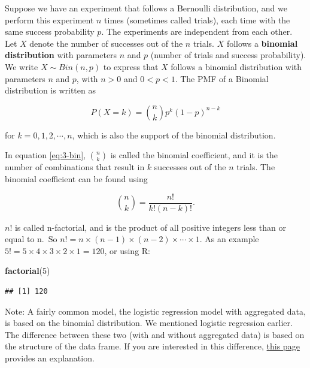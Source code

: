 \documentclass[
]{book}
\newenvironment{Shaded}{\begin{snugshade}}{\end{snugshade}}
\newcommand{\DecValTok}[1]{\textcolor[rgb]{0.00,0.00,0.81}{#1}}
\newcommand{\FunctionTok}[1]{\textcolor[rgb]{0.13,0.29,0.53}{\textbf{#1}}}
\newcommand{\NormalTok}[1]{#1}
\begin{document}
Suppose we have an experiment that follows a Bernoulli distribution, and we perform this experiment \(n\) times (sometimes called trials), each time with the same success probability \(p\). The experiments are independent from each other. Let \(X\) denote the number of successes out of the \(n\) trials. \(X\) follows a \textbf{binomial distribution} with parameters \(n\) and \(p\) (number of trials and success probability). We write \(X \sim Bin(n,p)\) to express that \(X\) follows a binomial distribution with parameters \(n\) and \(p\), with \(n>0\) and \(0<p<1\). The PMF of a Binomial distribution is written as

\begin{equation} 
P(X=k) = \binom{n}{k} p^k (1-p)^{n-k}
\label{eq:3-bin}
\end{equation}

for \(k=0,1,2, \cdots, n\), which is also the support of the binomial distribution.

In equation \eqref{eq:3-bin}, \(\binom{n}{k}\) is called the binomial coefficient, and it is the number of combinations that result in \(k\) successes out of the \(n\) trials. The binomial coefficient can be found using

\begin{equation} 
\binom{n}{k} =  \frac{n!}{k! (n-k)!}.
\label{eq:3-bincoeff}
\end{equation}

\(n!\) is called n-factorial, and is the product of all positive integers less than or equal to n.~So \(n! = n \times (n-1) \times (n-2) \times \cdots \times 1.\) As an example \(5! = 5 \times 4 \times 3 \times 2 \times 1 = 120\), or using R:

\begin{Shaded}
\begin{Highlighting}[]
\FunctionTok{factorial}\NormalTok{(}\DecValTok{5}\NormalTok{)}
\end{Highlighting}
\end{Shaded}

\begin{verbatim}
## [1] 120
\end{verbatim}

Note: A fairly common model, the logistic regression model with aggregated data, is based on the binomial distribution. We mentioned logistic regression earlier. The difference between these two (with and without aggregated data) is based on the structure of the data frame. If you are interested in this difference, \href{https://www.r-bloggers.com/2021/02/how-to-run-logistic-regression-on-aggregate-data-in-r/}{this page} provides an explanation.
\end{document}
